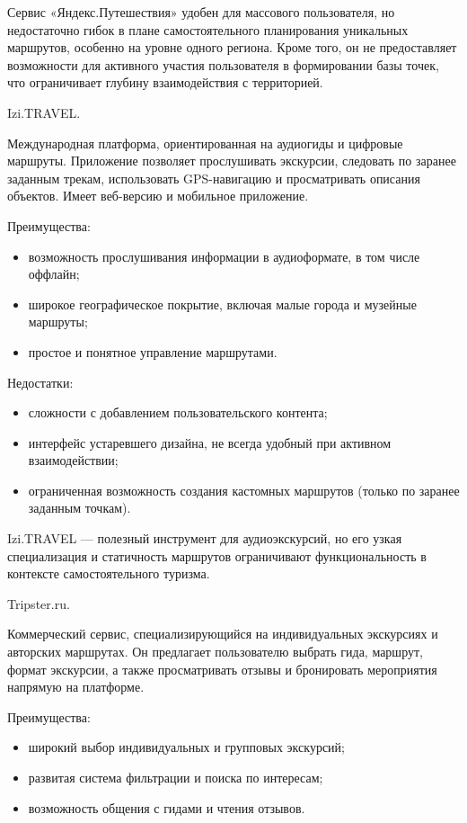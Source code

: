 Сервис «Яндекс.Путешествия» удобен для массового пользователя, но недостаточно гибок в плане самостоятельного планирования уникальных маршрутов, особенно на уровне одного региона. Кроме того, он не предоставляет возможности для активного участия пользователя в формировании базы точек, что ограничивает глубину взаимодействия с территорией.

Izi.TRAVEL.

Международная платформа, ориентированная на аудиогиды и цифровые маршруты. Приложение позволяет прослушивать экскурсии, следовать по заранее заданным трекам, использовать GPS-навигацию и просматривать описания объектов. Имеет веб-версию и мобильное приложение.

Преимущества:
\begin{itemize}
	\item возможность прослушивания информации в аудиоформате, в том числе оффлайн;
	\item широкое географическое покрытие, включая малые города и музейные маршруты;
	\item простое и понятное управление маршрутами.
\end{itemize}

Недостатки:
\begin{itemize}
	\item сложности с добавлением пользовательского контента;
	\item интерфейс устаревшего дизайна, не всегда удобный при активном взаимодействии;
	\item ограниченная возможность создания кастомных маршрутов (только по заранее заданным точкам).
\end{itemize}

Izi.TRAVEL — полезный инструмент для аудиоэкскурсий, но его узкая специализация и статичность маршрутов ограничивают функциональность в контексте самостоятельного туризма.

Tripster.ru.

Коммерческий сервис, специализирующийся на индивидуальных экскурсиях и авторских маршрутах. Он предлагает пользователю выбрать гида, маршрут, формат экскурсии, а также просматривать отзывы и бронировать мероприятия напрямую на платформе.

Преимущества:
\begin{itemize}
	\item широкий выбор индивидуальных и групповых экскурсий;
	\item развитая система фильтрации и поиска по интересам;
	\item возможность общения с гидами и чтения отзывов.
\end{itemize}


